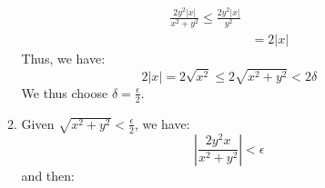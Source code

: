 \begin{itemize}
\begin{example}
\begin{enumerate}
\begin{align}
                \frac{2y^2|x|}{x^2+y^2} \le \frac{2y^2|x|}{y^2} \\ 
                &= 2|x|
            \end{align}
            Thus, we have:
            \begin{equation}
                2|x| = 2\sqrt{x^2} \le 2\sqrt{x^2+y^2} < 2\delta
            \end{equation}
            We thus choose $\delta = \frac{\epsilon}{2}$.
            \item Given $\sqrt{x^2+y^2}<\frac{\epsilon}{2}$, we have:
            \begin{equation}
                \left|\frac{2y^2x}{x^2+y^2}\right| < \epsilon
            \end{equation}
            and then:
            \begin{equation}
            \end{equation}            
        \end{enumerate}
    \end{example}
\end{itemize}